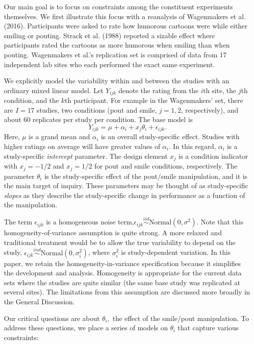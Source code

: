 \documentclass[english,man]{apa6}
\theoremstyle{definition}
\theoremstyle{definition}
\theoremstyle{remark}
\begin{document}
Our main goal is to focus on constraints among the constituent
experiments themselves. We first illustrate this focus with a reanalysis
of Wagenmakers et al. (2016). Participants were asked to rate how
humorous cartoons were while either smiling or pouting. Strack et al.
(1988) reported a sizable effect where participants rated the cartoons
as more humorous when smiling than when pouting. Wagenmakers et al.'s
replication set is comprised of data from 17 independent lab sites who
each performed the exact same experiment.

We explicitly model the variability within and between the studies with
an ordinary mixed linear model. Let \(Y_{ijk}\) denote the rating from
the \(i\)th site, the \(j\)th condition, and the \(k\)th participant.
For example in the Wagenmakers' set, there are \(I=17\) studies, two
conditions (pout and smile, \(j=1,2\), respectively), and about 60
replicates per study per condition. The base model is \[
Y_{ijk} = \mu+\alpha_i + x_j\theta_i+\epsilon_{ijk}.
\] Here, \(\mu\) is a grand mean and \(\alpha_i\) is an overall
study-specific effect. Studies with higher ratings on average will have
greater values of \(\alpha_i\). In this regard, \(\alpha_i\) is a
study-specific \emph{intercept} parameter. The design element \(x_j\) is
a condition indicator with \(x_j=-1/2\) and \(x_j=1/2\) for pout and
smile conditions, respectively. The parameter \(\theta_i\) is the
study-specific effect of the pout/smile manipulation, and it is the main
target of inquiry. These parameters may be thought of as study-specific
\emph{slopes} as they describe the study-specific change in performance
as a function of the manipulation.

The term \(\epsilon_{ijk}\) is a homogeneous noise
term,\(\epsilon_{ijk}\stackrel{iid}{\sim}\mbox{Normal}(0,\sigma^2)\).
Note that this homogeneity-of-variance assumption is quite strong. A
more relaxed and traditional treatment would be to allow the true
variability to depend on the study,
\(\epsilon_{ijk}\stackrel{ind}{\sim}\mbox{Normal}(0,\sigma^2_i)\), where
\(\sigma^2_i\) is study-dependent variation. In this paper, we retain
the homogeneity-in-variance specification because it simplifies the
development and analysis. Homogeneity is appropriate for the current
data sets where the studies are quite similar (the same base study was
replicated at several sites). The limitations from this assumption are
discussed more broadly in the General Discussion.

Our critical questions are about \(\theta_i,\) the effect of the
smile/pout manipulation. To address these questions, we place a series
of models on \(\theta_i\) that capture various constraints:
\end{document}
